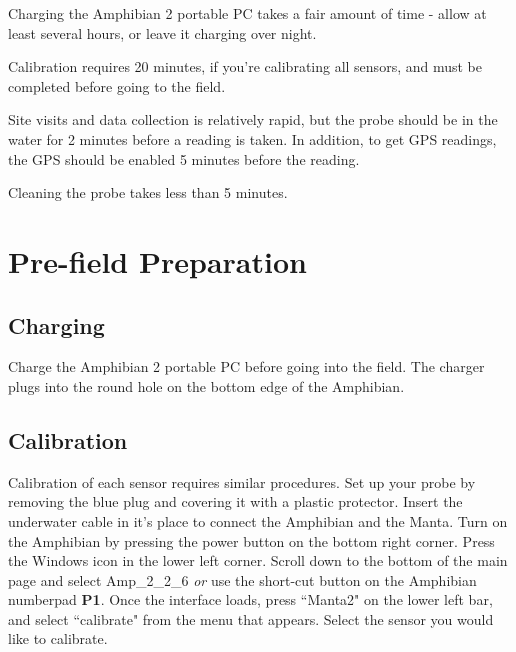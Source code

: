 \documentclass[12pt]{../SOP3_beta}\usepackage[]{graphicx}\usepackage[]{color}
\begin{document}
\NP Charging the Amphibian 2 portable PC takes a fair amount of time - allow at least several hours, or leave it charging over night. 

\NP Calibration requires 20 minutes, if you're calibrating all sensors, and must be completed before going to the field.

\NP Site visits and data collection is relatively rapid, but the probe should be in the water for 2 minutes before a reading is taken. In addition, to get GPS readings, the GPS should be enabled 5 minutes before the reading.

\NP Cleaning the probe takes less than 5 minutes.

\section{Pre-field Preparation}

\subsection{Charging}

\NP Charge the Amphibian 2 portable PC before going into the field. The charger plugs into the round hole on the bottom edge of the Amphibian. 

\subsection{Calibration}

\NP Calibration of each sensor requires similar procedures. Set up your probe by removing the blue plug and covering it with a plastic protector. Insert the underwater cable in it's place to connect the Amphibian and the Manta. Turn on the Amphibian by pressing the power button on the bottom right corner. Press the Windows icon in the lower left corner. Scroll down to the bottom of the main page and select Amp\_2\_2\_6 \emph{or} use the short-cut button on the Amphibian numberpad \textbf{P1}. Once the interface loads, press ``Manta2" on the lower left bar, and select ``calibrate" from the menu that appears. Select the sensor you would like to calibrate. 
\end{document}
